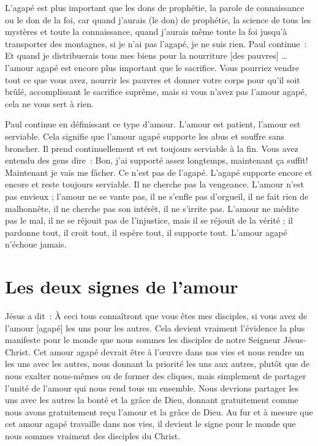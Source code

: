 L'agapé est plus important que les dons de prophétie,
 la parole de connaissance ou le don de la foi,
 car \og quand j'aurais (le don) de prophétie,
 la science de tous les mystères et toute la connaissance,
 quand j'aurais même toute la foi jusqu'à transporter des montagnes,
 si je n'ai pas l'agapé, je ne suis rien. \fg{} Paul continue~:
 \og Et quand je distribuerais tous mes biens
 pour la nourriture [des pauvres] \dots{} \fg{}
 l'amour agapé est encore plus important que le sacrifice.
 Vous pourriez vendre tout ce que vous avez, nourrir les pauvres
 et donner votre corps pour qu'il soit brûlé, accomplissant le sacrifice
 suprême, mais si vous n'avez pas l'amour agapé,
 cela ne vous sert à rien.

Paul continue en définissant ce type d'amour.
 \og L'amour est patient, l'amour est serviable. \fg{}
 Cela signifie que l'amour agapé supporte les abus et souffre sans broncher.
 Il prend continuellement et est toujours serviable à la fin.
 Vous avez entendu des gens dire~:
 \og Bon, j'ai supporté assez longtemps, maintenant ça suffit!
 Maintenant je vais me fâcher. \fg{}
 Ce n'est pas de l'agapé. L'agapé supporte encore et encore
 et reste toujours serviable. Il ne cherche pas la vengeance.
 \og L'amour n'est pas envieux ; l'amour ne se vante pas,
 il ne s'enfle pas d'orgueil, il ne fait rien de malhonnête,
 il ne cherche pas son intérêt, il ne s'irrite pas.
 L'amour ne médite pas le mal, il ne se réjouit pas de l'injustice,
 mais il se réjouit de la vérité ; il pardonne tout, il croit tout,
 il espère tout, il supporte tout. \fg{}
 L'amour agapé \og n'échoue jamais. \fg{}


\section*{Les deux signes de l'amour}

Jésus a dit~:
 \og À ceci tous connaîtront que vous êtes mes disciples,
 si vous avez de l'amour [agapé] les uns pour les autres. \fg{}
 Cela devient vraiment l'évidence la plus manifeste pour le monde
 que nous sommes les disciples de notre Seigneur Jésus-Christ.
 Cet amour agapé devrait être à l'œuvre dans nos vies et nous rendre un
 les uns avec les autres, nous donnant la priorité les uns aux autres,
 plutôt que de nous exalter nous-mêmes ou de former des cliques,
 mais simplement de partager l'unité de l'amour qui nous rend
 tous un ensemble.
 Nous devrions partager les uns avec les autres la bonté et la grâce de Dieu,
 donnant gratuitement comme nous avons gratuitement reçu l'amour
 et la grâce de Dieu.
 Au fur et à mesure que cet amour agapé travaille dans nos vies,
 il devient le signe pour le monde que nous sommes vraiment
 des disciples du Christ.

